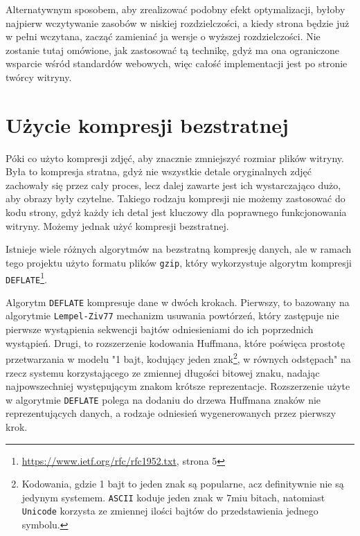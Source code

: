 \documentclass[licencjacka]{pracadypl}
\begin{document}
Alternatywnym sposobem, aby zrealizować podobny efekt optymalizacji, byłoby najpierw wczytywanie zasobów w niskiej rozdzielczości, a kiedy strona będzie już w pełni wczytana, zacząć zamieniać ja wersje o wyższej rozdzielczości. Nie zostanie tutaj omówione, jak zastosować tą technikę, gdyż ma ona ograniczone wsparcie wśród standardów webowych, więc całość implementacji jest po stronie twórcy witryny.


\section{Użycie kompresji bezstratnej}

Póki co użyto kompresji zdjęć, aby znacznie zmniejszyć rozmiar plików witryny. Była to kompresja stratna, gdyż nie wszystkie detale oryginalnych zdjęć zachowały się przez cały proces, lecz dalej zawarte jest ich wystarczająco dużo, aby obrazy były czytelne. Takiego rodzaju kompresji nie możemy zastosować do kodu strony, gdyż każdy ich detal jest kluczowy dla poprawnego funkcjonowania witryny. Możemy jednak użyć kompresji bezstratnej.

Istnieje wiele różnych algorytmów na bezstratną kompresję danych, ale w ramach tego projektu użyto formatu plików \texttt{gzip}, który wykorzystuje algorytm kompresji \texttt{DEFLATE}\footnote{\url{https://www.ietf.org/rfc/rfc1952.txt}, strona 5}.

Algorytm \texttt{DEFLATE} kompresuje dane w dwóch krokach. Pierwszy, to bazowany na algorytmie \texttt{Lempel-Ziv77} mechanizm usuwania powtórzeń, który zastępuje nie pierwsze wystąpienia sekwencji bajtów odniesieniami do ich poprzednich wystąpień. Drugi, to rozszerzenie kodowania Huffmana, które poświęca prostotę przetwarzania w modelu "1 bajt, kodujący jeden znak\footnote{Kodowania, gdzie 1 bajt to jeden znak są popularne, acz definitywnie nie są jedynym systemem. \texttt{ASCII} koduje jeden znak w $7$miu bitach, natomiast \texttt{Unicode} korzysta ze zmiennej ilości bajtów do przedstawienia jednego symbolu.}, w równych odstępach" na rzecz systemu korzystającego ze zmiennej długości bitowej znaku, nadając najpowszechniej występującym znakom krótsze reprezentacje. Rozszerzenie użyte w algorytmie \texttt{DEFLATE} polega na dodaniu do drzewa Huffmana znaków nie reprezentujących danych, a rodzaje odniesień wygenerowanych przez pierwszy krok.
\end{document}
